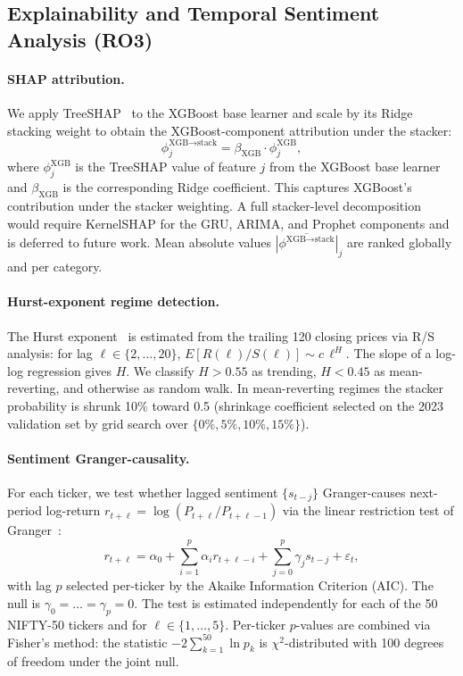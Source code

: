 \subsection{Explainability and Temporal Sentiment Analysis (RO3)}
\label{subsec:xai}

\paragraph{SHAP attribution.}
We apply TreeSHAP~\cite{lundberg2017shap} to the XGBoost base learner and
scale by its Ridge stacking weight to obtain the XGBoost-component
attribution under the stacker:
\begin{equation}
\phi_j^{\text{XGB}\to\text{stack}} = \beta_{\text{XGB}} \cdot \phi_{j}^{\text{XGB}},
\label{eq:shap_prop}
\end{equation}
where $\phi_j^{\text{XGB}}$ is the TreeSHAP value of feature $j$ from the
XGBoost base learner and $\beta_{\text{XGB}}$ is the corresponding Ridge
coefficient. This captures XGBoost's contribution under the stacker weighting.
A full stacker-level decomposition would require KernelSHAP for the GRU,
ARIMA, and Prophet components and is deferred to future work.
Mean absolute values $\overline{|\phi^{\text{XGB}\to\text{stack}}|}_j$ are
ranked globally and per category.

\paragraph{Hurst-exponent regime detection.}
The Hurst exponent~\cite{hurst1951longterm} is estimated from the trailing
120 closing prices via R/S analysis: for lag $\ell\in\{2,\ldots,20\}$,
$E[R(\ell)/S(\ell)] \sim c\,\ell^{H}$. The slope of a log-log regression
gives $H$. We classify $H\!>\!0.55$ as trending, $H\!<\!0.45$ as
mean-reverting, and otherwise as random walk. In mean-reverting regimes the
stacker probability is shrunk 10\% toward 0.5 (shrinkage coefficient selected
on the 2023 validation set by grid search over $\{0\%,5\%,10\%,15\%\}$).

\paragraph{Sentiment Granger-causality.}
For each ticker, we test whether lagged sentiment $\{s_{t-j}\}$ Granger-causes
next-period log-return $r_{t+\ell}=\log(P_{t+\ell}/P_{t+\ell-1})$ via the
linear restriction test of Granger~\cite{granger1969causality}:
\begin{equation}
r_{t+\ell} = \alpha_0 + \sum_{i=1}^{p}\alpha_i r_{t+\ell-i}
           + \sum_{j=0}^{p}\gamma_j s_{t-j} + \varepsilon_t,
\label{eq:granger}
\end{equation}
with lag $p$ selected per-ticker by the Akaike Information Criterion (AIC).
The null is $\gamma_0=\dots=\gamma_p=0$.  The test is estimated independently
for each of the 50 NIFTY-50 tickers and for $\ell\in\{1,\ldots,5\}$.
Per-ticker $p$-values are combined via Fisher's method: the statistic
$-2\sum_{k=1}^{50}\ln p_k$ is $\chi^2$-distributed with 100 degrees of freedom
under the joint null.

